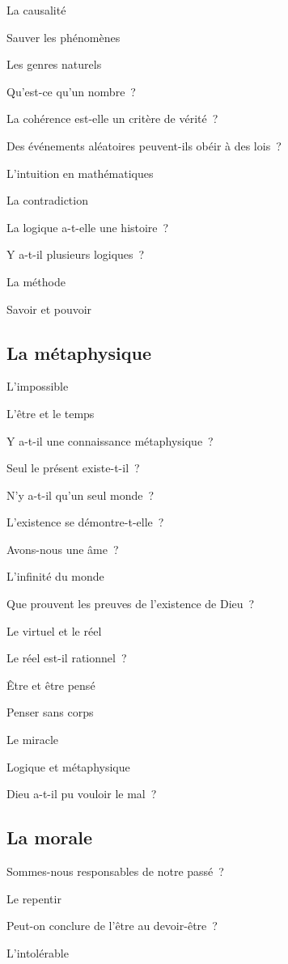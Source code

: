\documentclass[a4paper,12pt]{article}
\begin{document}
La causalité

Sauver les phénomènes

Les genres naturels

Qu'est-ce qu'un nombre ?

La cohérence est-elle un critère de vérité ?

Des événements aléatoires peuvent-ils obéir à des lois ?

L'intuition en mathématiques

La contradiction

La logique a-t-elle une histoire ?

Y a-t-il plusieurs logiques ?

La méthode

Savoir et pouvoir

\subsection{La métaphysique}
\label{sec-6-3}

L'impossible

L'être et le temps

Y a-t-il une connaissance métaphysique ?

Seul le présent existe-t-il ?

N'y a-t-il qu'un seul monde ?

L'existence se démontre-t-elle ?

Avons-nous une âme ?

L'infinité du monde

Que prouvent les preuves de l'existence de Dieu ?

Le virtuel et le réel

Le réel est-il rationnel ?

Être et être pensé

Penser sans corps

Le miracle

Logique et métaphysique

Dieu a-t-il pu vouloir le mal ?

\subsection{La morale}
\label{sec-6-4}

Sommes-nous responsables de notre passé ?

Le repentir

Peut-on conclure de l'être au devoir-être ?

L'intolérable
\end{document}
